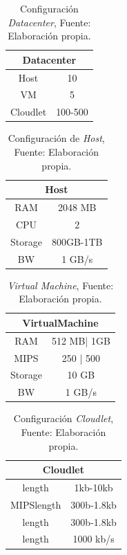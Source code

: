 \setcounter{table}{0}
\renewcommand\thetable{\arabic{table}}
\begin{table}[h!]
	\centering
	\begin{tabular}{@{}cc@{}}
		\toprule
		\multicolumn{2}{c}{{\bf Datacenter}} \\ \midrule
		Host              & 10               \\
		VM                & 5                \\
		Cloudlet          & 100-500          \\ \bottomrule
		
	\end{tabular}
	\caption{Configuraci\'on \textit{Datacenter}, Fuente: Elaboraci\'on propia.}
	\label{table:datacenter}
\end{table}
 
\setcounter{table}{1}
\renewcommand\thetable{\arabic{table}}
\begin{table}[h!]
	\centering
	\begin{tabular}{@{}cc@{}}
		\toprule
		\multicolumn{2}{c}{{\bf Host}} \\ \midrule
		RAM           & 2048 MB        \\
		CPU           & 2              \\
		Storage       & 800GB-1TB      \\ \midrule
		BW            & 1 GB/s        
	\end{tabular}
	\caption{Configuraci\'on de \textit{Host}, Fuente: Elaboraci\'on propia.}
	\label{tab:host}
\end{table}

\newpage

\setcounter{table}{2}
\renewcommand\thetable{\arabic{table}}
\begin{table}[h!]
	\centering
	\begin{tabular}{@{}cc@{}}
		\toprule
		\multicolumn{2}{c}{{\bf VirtualMachine}} \\ \midrule
		RAM               & 512 MB| 1GB          \\
		MIPS              & 250 | 500            \\
		Storage           & 10 GB                \\ \midrule
		BW                & 1 GB/s              
	\end{tabular}
	\caption{\textit{Virtual Machine}, Fuente: Elaboraci\'on propia.}
	\label{tab:machine}
\end{table}


\setcounter{table}{3}
\renewcommand\thetable{\arabic{table}}
\begin{table}[h!]
	\centering
	\begin{tabular}{@{}cc@{}}
		\toprule
		\multicolumn{2}{c}{{\bf Cloudlet}} \\ \midrule
		length           & 1kb-10kb        \\
		MIPSlength       & 300b-1.8kb      \\
		length           & 300b-1.8kb      \\ \midrule
		length           & 1000 kb/s      
	\end{tabular}
	\caption{Configuraci\'on \textit{Cloudlet}, Fuente: Elaboraci\'on propia.}
	\label{tab:cloudlet}
\end{table}


